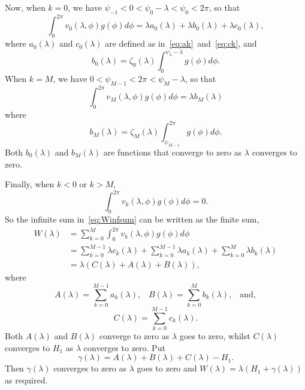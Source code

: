 \documentclass[journal]{IEEEtran}
\begin{document}
\begin{IEEEproof}
Now, when $k = 0$, we have $\psi_{-1} < 0 < \psi_0 - \lambda < \psi_0 < 2\pi$, so that
\[
\int_0^{2\pi} v_0(\lambda, \phi) g(\phi) d\phi = \lambda a_0(\lambda) + \lambda b_0(\lambda) +  \lambda c_0(\lambda),
\]
where $a_0(\lambda)$ and $c_0(\lambda)$ are defined as in~\eqref{eq:ak}~and~\eqref{eq:ck}, and
\[
b_0(\lambda) = \zeta_0(\lambda) \int_{0}^{\psi_k-\lambda} g(\phi) d\phi.
\]
When $k = M$, we have $0 < \psi_{M-1} < 2\pi < \psi_{M} - \lambda$, so that
\[
\int_0^{2\pi} v_{M}(\lambda, \phi) g(\phi) d\phi = \lambda b_{M}(\lambda)
\]
where 
\[
b_{M}(\lambda) = \zeta_{M}(\lambda) \int_{\psi_{M-1}}^{2\pi}g(\phi) d\phi.
\]
Both $b_0(\lambda)$ and $b_M(\lambda)$ are functions that converge to zero as $\lambda$ converges to zero.
 
Finally, when $k < 0$ or $k > M$, 
\[
\int_0^{2\pi} v_k(\lambda, \phi) g(\phi) d\phi = 0.
\]
So the infinite sum in~\eqref{eq:Winfsum} can be written as the finite sum,
\begin{align*}
W(\lambda) &= \sum_{k=0}^{M} \int_{0}^{2\pi} v_k(\lambda, \phi) g(\phi) d\phi \\
&= \sum_{k=0}^{M-1} \lambda c_k(\lambda) + \sum_{k=0}^{M-1} \lambda a_k(\lambda) + \sum_{k=0}^{M} \lambda b_k(\lambda) \\
&= \lambda \left( C(\lambda)  + A(\lambda) + B(\lambda) \right),
\end{align*}
where 
\[
A(\lambda) = \sum_{k=0}^{M-1} a_k(\lambda), \;\;\; B(\lambda) = \sum_{k=0}^{M} b_k(\lambda), \;\;\; \text{and},
\]
\[
C(\lambda) = \sum_{k=0}^{M-1} c_k(\lambda).
\]
Both $A(\lambda)$ and $B(\lambda)$ converge to zero as $\lambda$ goes to zero, whilst $C(\lambda)$ converges to $H_1$ as $\lambda$ converges to zero.  Put
\[
\gamma(\lambda) = A(\lambda) + B(\lambda) + C(\lambda) - H_1.
\]
Then $\gamma(\lambda)$ converges to zero as $\lambda$ goes to zero and $W(\lambda) = \lambda(H_1 + \gamma(\lambda))$ as required.
\end{IEEEproof}
\end{document}

